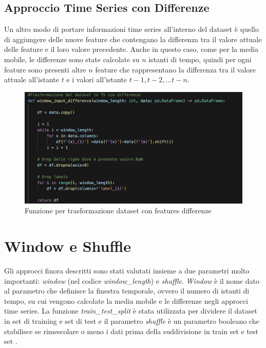 
\subsection{Approccio Time Series con Differenze}
Un altro modo di portare informazioni time series all'interno del dataset \`e quello di aggiungere delle nuove feature che contengano la differenza tra il valore attuale delle feature e il loro valore precedente. Anche in questo caso, come per la media mobile, le differenze sono state calcolate su $n$ istanti di tempo, quindi per ogni feature sono presenti altre $n$ feature che rappresentano la differenza tra il valore attuale all'istante $t$ e i valori all'istante $t-1,t-2,...t-n$.

\begin{figure}[H]
    \centering
    \includegraphics[width=0.9\linewidth]{def_ts_diff.png}
    \caption{Funzione per trasformazione dataset con features differenze}
    \label{fig:enter-label}
\end{figure}

\section{Window e Shuffle}
Gli approcci finora descritti sono stati valutati insieme a due parametri molto importanti: \textit{window} (nel codice \textit{window\_length}) e \textit{shuffle}. \textit{Window} \`e il nome dato al parametro che definisce la finestra temporale, ovvero il numero di istanti di tempo, su cui vengono calcolate la media mobile e le differenze negli approcci time series. La funzione \textit{train\_test\_split} \`e stata utilizzata per dividere il dataset in set di training e set di test e il parametro \textit{shuffle} \`e un parametro booleano che stabilisce se rimescolare o meno i dati prima della suddivisione in train set e test set \cite{train_test_split}.

